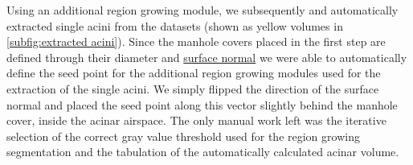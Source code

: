 \documentclass[%
	paper=a4,%
	abstract=true,%
	]{scrartcl}
\begin{document}
Using an additional region growing module, we subsequently and automatically extracted single acini from the datasets (shown as yellow volumes in \autoref{subfig:extracted acini}). Since the manhole covers placed in the first step are defined through their diameter and \href{https://secure.wikimedia.org/wikipedia/en/w/index.php?title=Surface_normal&oldid=411684319}{surface normal} we were able to automatically define the seed point for the additional region growing modules used for the extraction of the single acini. We simply flipped the direction of the surface normal and placed the seed point along this vector slightly behind the manhole cover, inside the acinar airspace. The only manual work left was the iterative selection of the correct gray value threshold used for the region growing segmentation and the tabulation of the automatically calculated acinar volume.
\end{document}

